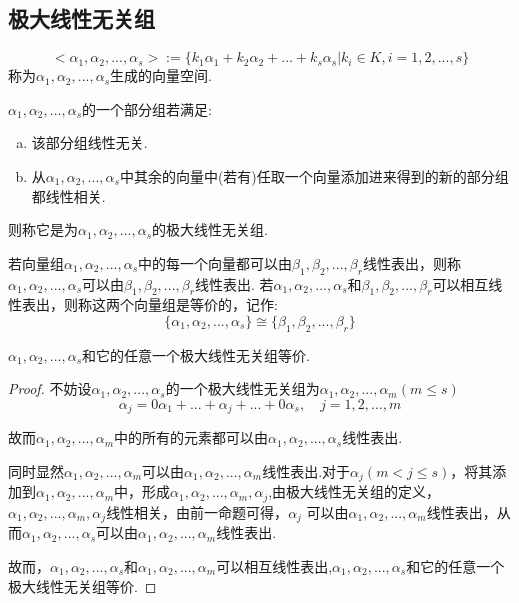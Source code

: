 \documentclass[blue,normal,cn]{elegantnote}
\begin{document}
\subsection{极大线性无关组}
\begin{definition}
    \begin{equation*}
        <α_1,α_2,...,α_s>:=\{k_1 α_1+k_2 α_2+...+k_s α_s|k_i\in K,i=1,2,...,s\}
    \end{equation*}
称为$α_1,α_2,...,α_s$生成的向量空间.
\end{definition}


\begin{definition}
    $α_1,α_2,...,α_s$的一个部分组若满足:
    \begin{enumerate}[(a)]
        \item 该部分组线性无关.
        \item 从$α_1,α_2,...,α_s$中其余的向量中(若有)任取一个向量添加进来得到的新的部分组都线性相关.
    \end{enumerate}
    则称它是为$α_1,α_2,...,α_s$的极大线性无关组.
\end{definition}

\begin{definition}
    若向量组$α_1,α_2,...,α_s$中的每一个向量都可以由$β_1,β_2,...,β_r$线性表出，则称$α_1,α_2,...,α_s$可以由$β_1,β_2,...,β_r$线性表出.
    若$α_1,α_2,...,α_s$和$β_1,β_2,...,β_r$可以相互线性表出，则称这两个向量组是等价的，记作:
    \begin{equation*}
        \{α_1,α_2,...,α_s\} \cong \{β_1,β_2,...,β_r\}
    \end{equation*}
\end{definition}

\begin{proposition}
    $α_1,α_2,...,α_s$和它的任意一个极大线性无关组等价.
\end{proposition}

\begin{proof}
    不妨设$α_1,α_2,...,α_s$的一个极大线性无关组为$α_1,α_2,...,α_m(m≤s)$
    \begin{equation*}
        α_j=0α_1+...+α_j+...+0α_s,\quad j=1,2,...,m
    \end{equation*}

    故而$α_1,α_2,...,α_m$中的所有的元素都可以由$α_1,α_2,...,α_s$线性表出.

    同时显然$α_1,α_2,...,α_m$可以由$α_1,α_2,...,α_m$线性表出.对于$α_j(m<j≤s)$，将其添加到$α_1,α_2,...,α_m$中，形成$α_1,α_2,...,α_m,α_j$,由极大线性无关组的定义，$α_1,α_2,...,α_m,α_j$线性相关，由前一命题可得，$α_j$
    可以由$α_1,α_2,...,α_m$线性表出，从而$α_1,α_2,...,α_s$可以由$α_1,α_2,...,α_m$线性表出.

    故而，$α_1,α_2,...,α_s$和$α_1,α_2,...,α_m$可以相互线性表出,$α_1,α_2,...,α_s$和它的任意一个极大线性无关组等价.
\end{proof}
\end{document}
